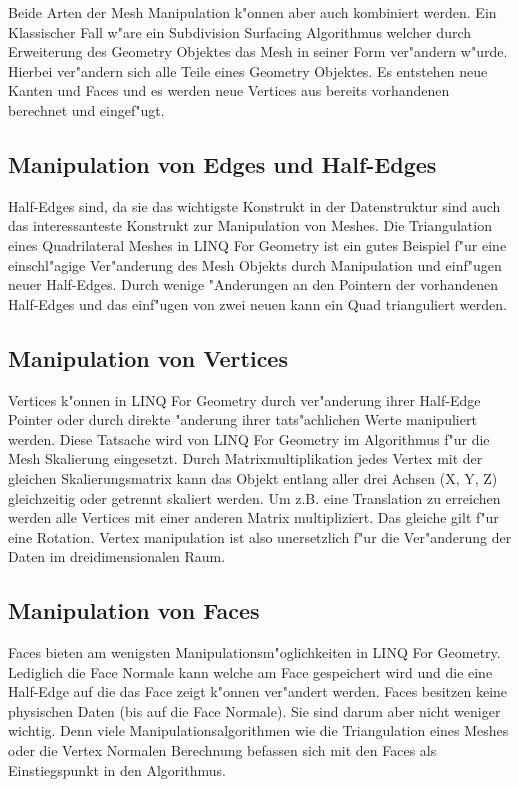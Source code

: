 \documentclass[pagesize, paper=a4, fontsize=12pt,titlepage=true, headings=small, headnosepline, abstractoff, liststotoc, nochapterprefix, plainheadsepline]{scrreprt}
\newcommand{\LFG}{LINQ For Geometry}
\newcommand{\LFGS}{LINQ For Geometry }
\begin{document}
Beide Arten der Mesh Manipulation k"onnen aber auch kombiniert werden. Ein Klassischer Fall w"are ein Subdivision Surfacing Algorithmus welcher durch Erweiterung des Geometry Objektes das Mesh in seiner Form ver"andern w"urde. Hierbei ver"andern sich alle Teile eines Geometry Objektes. Es entstehen neue Kanten und Faces und es werden neue Vertices aus bereits vorhandenen berechnet und eingef"ugt. 
		\subsection {Manipulation von Edges und Half-Edges}
			Half-Edges sind, da sie das wichtigste Konstrukt in der Datenstruktur sind auch das interessanteste Konstrukt zur Manipulation von Meshes. Die Triangulation eines Quadrilateral Meshes in \LFGS ist ein gutes Beispiel f"ur eine einschl"agige Ver"anderung des Mesh Objekts durch Manipulation und einf"ugen neuer Half-Edges. Durch wenige "Anderungen an den Pointern der vorhandenen Half-Edges und das einf"ugen von zwei neuen kann ein Quad trianguliert werden.

		\subsection {Manipulation von Vertices}
			Vertices k"onnen in \LFGS durch ver"anderung ihrer Half-Edge Pointer oder durch direkte "anderung ihrer tats"achlichen Werte manipuliert werden. Diese Tatsache wird von \LFGS im Algorithmus f"ur die Mesh Skalierung eingesetzt. Durch Matrixmultiplikation jedes Vertex mit der gleichen Skalierungsmatrix kann das Objekt entlang aller drei Achsen (X, Y, Z) gleichzeitig oder getrennt skaliert werden. Um z.B. eine Translation zu erreichen werden alle Vertices mit einer anderen Matrix multipliziert. Das gleiche gilt f"ur eine Rotation. Vertex manipulation ist also unersetzlich f"ur die Ver"anderung der Daten im dreidimensionalen Raum.
		\subsection {Manipulation von Faces}
			Faces bieten am wenigsten Manipulationsm"oglichkeiten in \LFG. Lediglich die Face Normale kann welche am Face gespeichert wird und die eine Half-Edge auf die das Face zeigt k"onnen ver"andert werden. Faces besitzen keine physischen Daten (bis auf die Face Normale). Sie sind darum aber nicht weniger wichtig. Denn viele Manipulationsalgorithmen wie die Triangulation eines Meshes oder die Vertex Normalen Berechnung befassen sich mit den Faces als Einstiegspunkt in den Algorithmus.
\end{document}
